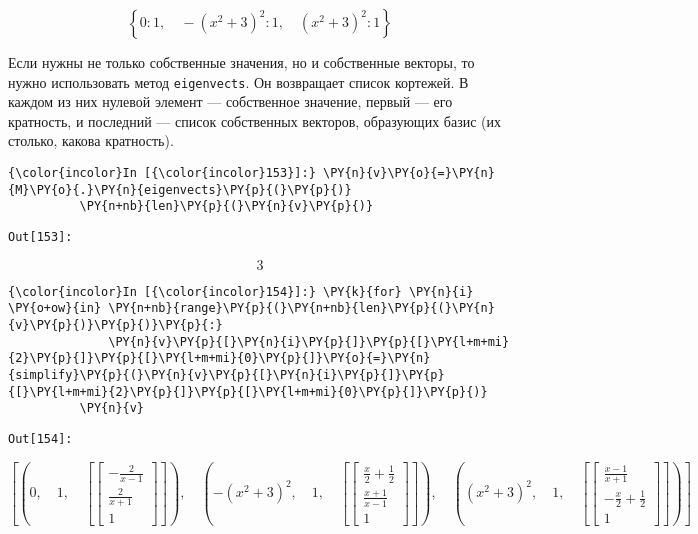     \[\left \{ 0 : 1, \quad - \left(x^{2} + 3\right)^{2} : 1, \quad \left(x^{2} + 3\right)^{2} : 1\right \}\]

    

    Если нужны не только собственные значения, но и собственные векторы, то
нужно использовать метод \texttt{eigenvects}. Он возвращает список
кортежей. В каждом из них нулевой элемент --- собственное значение, первый
--- его кратность, и последний --- список собственных векторов, образующих
базис (их столько, какова кратность).

    \begin{Verbatim}[commandchars=\\\{\}]
{\color{incolor}In [{\color{incolor}153}]:} \PY{n}{v}\PY{o}{=}\PY{n}{M}\PY{o}{.}\PY{n}{eigenvects}\PY{p}{(}\PY{p}{)}
          \PY{n+nb}{len}\PY{p}{(}\PY{n}{v}\PY{p}{)}
\end{Verbatim}
\texttt{\color{outcolor}Out[{\color{outcolor}153}]:}
    
    \[3\]

    

    \begin{Verbatim}[commandchars=\\\{\}]
{\color{incolor}In [{\color{incolor}154}]:} \PY{k}{for} \PY{n}{i} \PY{o+ow}{in} \PY{n+nb}{range}\PY{p}{(}\PY{n+nb}{len}\PY{p}{(}\PY{n}{v}\PY{p}{)}\PY{p}{)}\PY{p}{:}
              \PY{n}{v}\PY{p}{[}\PY{n}{i}\PY{p}{]}\PY{p}{[}\PY{l+m+mi}{2}\PY{p}{]}\PY{p}{[}\PY{l+m+mi}{0}\PY{p}{]}\PY{o}{=}\PY{n}{simplify}\PY{p}{(}\PY{n}{v}\PY{p}{[}\PY{n}{i}\PY{p}{]}\PY{p}{[}\PY{l+m+mi}{2}\PY{p}{]}\PY{p}{[}\PY{l+m+mi}{0}\PY{p}{]}\PY{p}{)}
          \PY{n}{v}
\end{Verbatim}
\texttt{\color{outcolor}Out[{\color{outcolor}154}]:}
    
    \[\left [ \left ( 0, \quad 1, \quad \left [ \left[\begin{matrix}- \frac{2}{x - 1}\\\frac{2}{x + 1}\\1\end{matrix}\right]\right ]\right ), \quad \left ( - \left(x^{2} + 3\right)^{2}, \quad 1, \quad \left [ \left[\begin{matrix}\frac{x}{2} + \frac{1}{2}\\\frac{x + 1}{x - 1}\\1\end{matrix}\right]\right ]\right ), \quad \left ( \left(x^{2} + 3\right)^{2}, \quad 1, \quad \left [ \left[\begin{matrix}\frac{x - 1}{x + 1}\\- \frac{x}{2} + \frac{1}{2}\\1\end{matrix}\right]\right ]\right )\right ]\]

